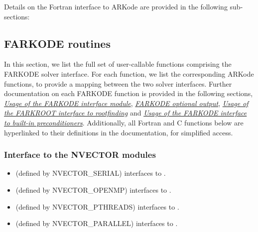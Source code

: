\documentclass[letterpaper,10pt,english]{sphinxmanual}
\begin{document}
Details on the Fortran interface to ARKode are provided in the
following sub-sections:


\subsection{FARKODE routines}
\label{f_interface/Routines:finterface-routines}\label{f_interface/Routines::doc}\label{f_interface/Routines:farkode-routines}
In this section, we list the full set of user-callable functions
comprising the FARKODE solver interface.  For each function, we list
the corresponding ARKode functions, to provide a mapping between the
two solver interfaces.  Further documentation on each FARKODE function
is provided in the following sections, {\hyperref[f_interface/Usage:finterface-usage]{\emph{Usage of the FARKODE interface module}}},
{\hyperref[f_interface/Optional_output:finterface-optionaloutputs]{\emph{FARKODE optional output}}}, {\hyperref[f_interface/Rootfinding:finterface-rootfinding]{\emph{Usage of the FARKROOT interface to rootfinding}}} and
{\hyperref[f_interface/Preconditioning:finterface-preconditioning]{\emph{Usage of the FARKODE interface to built-in preconditioners}}}.  Additionally, all Fortran and C
functions below are hyperlinked to their definitions in the
documentation, for simplified access.


\subsubsection{Interface to the NVECTOR modules}
\label{f_interface/Routines:interface-to-the-nvector-modules}\begin{itemize}
\item {} 
{\hyperref[f_interface/Usage:f/_/FNVINITS]{}} (defined by NVECTOR\_SERIAL) interfaces to
{\hyperref[nvectors/NVector_Serial:N_VNewEmpty_Serial]{}}.

\item {} 
{\hyperref[f_interface/Usage:f/_/FNVINITS_OPENMP]{}} (defined by NVECTOR\_OPENMP) interfaces to
{\hyperref[nvectors/NVector_OpenMP:N_VNewEmpty_OpenMP]{}}.

\item {} 
{\hyperref[f_interface/Usage:f/_/FNVINITS_PTHREADS]{}} (defined by NVECTOR\_PTHREADS) interfaces to
{\hyperref[nvectors/NVector_Pthreads:N_VNewEmpty_Pthreads]{}}.

\item {} 
{\hyperref[f_interface/Usage:f/_/FNVINITP]{}} (defined by NVECTOR\_PARALLEL) interfaces to
{\hyperref[nvectors/NVector_Parallel:N_VNewEmpty_Parallel]{}}.

\end{itemize}
\end{document}
